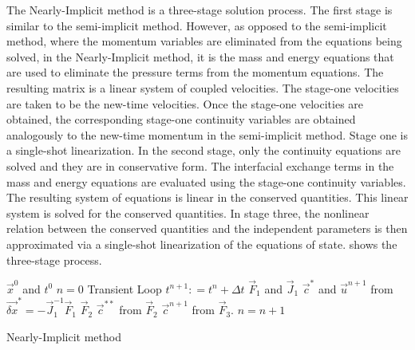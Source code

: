 The Nearly-Implicit method is a three-stage solution process.
The first stage is similar to the semi-implicit method.
However, as opposed to the semi-implicit method, where the momentum variables are eliminated from the equations being solved, in the Nearly-Implicit method, it is the mass and energy equations that are used to eliminate the pressure terms from the momentum equations.
The resulting matrix is a linear system of coupled velocities.
The stage-one velocities are taken to be the new-time velocities.
Once the stage-one velocities are obtained, the corresponding stage-one continuity variables are obtained analogously to the new-time momentum in the semi-implicit method.
Stage one is a single-shot linearization.
In the second stage, only the continuity equations are solved and they are in conservative form.
The interfacial exchange terms in the mass and energy equations are evaluated using the stage-one continuity variables.
The resulting system of equations is linear in the conserved quantities.
This linear system is solved for the conserved quantities.
In stage three, the nonlinear relation between the conserved quantities and the independent parameters is then approximated via a single-shot linearization of the equations of state.
 shows the three-stage process.

\begin{algo}[H]
\setlength{\baselineskip}{0.625\baselineskip}
\begin{algorithmic}[1]
\Require $\vec{x}^{0}$ and $t^{0}$
\Set $n = 0$
\Loop \; Transient Loop
    \State $t^{n+1} : = t^{n} + \Delta t$
	\Calculate $\vec{F}_1$ and $\vec{J}_1$
	\Calculate $\vec{c}^{*}$ and $\vec{u}^{n+1}$ from $\vec{\delta x}^{*} = -\vec{J}^{-1}_1\vec{F}_1$
	\Calculate $\vec{F}_2$
	\Calculate $\vec{c}^{**}$ from $\vec{F}_2$
	\Calculate $\vec{c}^{n+1}$ from $\vec{F}_3$.
	\State $n = n + 1$
\EndLoop
\end{algorithmic}
\caption{Nearly-Implicit method}
\label{alg:ni}
\end{algo}

